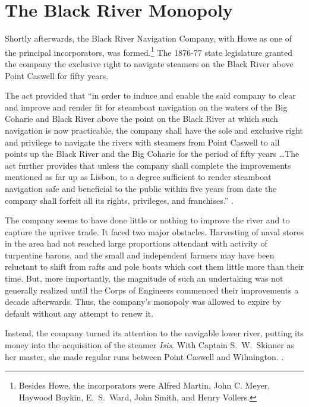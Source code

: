 \documentclass[11pt, a5paper, openright]{book}
\newcommand{\steamer}[1]{\textit{#1}\index{#1,~steamer}}
\newcommand{\steamerco}[1]{#1\index{#1}}
\begin{document}
\section{The Black River Monopoly}

Shortly afterwards, the \steamerco{Black River Navigation Company},
with Howe as one of the principal
incorporators, was formed.\footnote{Besides Howe, the incorporators
  were Alfred Martin, John C.
  Meyer, Haywood Boykin,
  E.~S.~Ward, John Smith, and
  Henry Vollers.}  The 1876-77 state legislature %
granted the company the exclusive right to navigate steamers on the
Black River above Point Caswell for fifty years.\par

The act provided that ``in order to induce and enable the said company
to clear and improve and render fit for steamboat navigation on the
waters of the Big Coharie and Black River above the point on the
Black River at which such navigation is now practicable, the company
shall have the sole and exclusive right and privilege to navigate the
rivers with steamers from Point Caswell to all points up the Black
River and the Big Coharie for the period of fifty years \ldots The act
further provides that unless the company shall complete the
improvements mentioned as far up as Lisbon, to a degree sufficient to
render steamboat navigation safe and beneficial to the public within
five years from date the company shall forfeit all its rights,
privileges, and franchises.''  \citep[2-12-1886]{ws}.\par

The company seems to have done little or nothing to improve the river
and to capture the upriver trade.  It faced two major obstacles.
Harvesting of naval stores in the area had not reached large
proportions attendant with activity of turpentine barons, and the
small and independent farmers may have been reluctant to shift from
rafts and pole boats which cost them little more than their time.
But, more importantly, the magnitude of such an undertaking was not
generally realized until the Corps of Engineers commenced their
improvements a decade afterwards.  Thus, the company's monopoly was
allowed to expire by default without any attempt to renew it.\par

Instead, the company turned its attention to the navigable lower
river, putting its money into the acquisition of the steamer
\steamer{Isis}.  With Captain
S.~W.~Skinner as her master, she made
regular runs between Point Caswell and Wilmington.  \citep[1-10-1879]{ws}.\par
\end{document}
